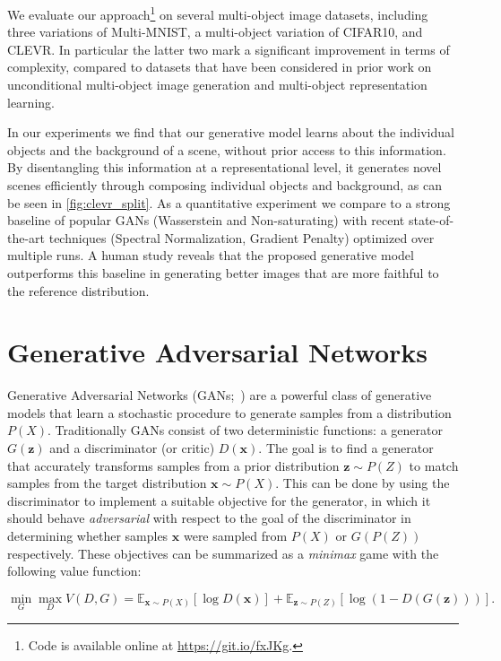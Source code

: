 \documentclass{article}
\begin{document}
We evaluate our approach\footnote{Code is available online at \url{https://git.io/fxJKg}.} on several multi-object image datasets, including three variations of Multi-MNIST, a multi-object variation of CIFAR10, and CLEVR.
In particular the latter two mark a significant improvement in terms of complexity, compared to datasets that have been considered in prior work on unconditional multi-object image generation and multi-object representation learning.

In our experiments we find that our generative model learns about the individual objects and the background of a scene, without prior access to this information.
By disentangling this information at a representational level, it generates novel scenes efficiently through composing individual objects and background, as can be seen in \autoref{fig:clevr_split}.
As a quantitative experiment we compare to a strong baseline of popular GANs (Wasserstein and Non-saturating) with recent state-of-the-art techniques (Spectral Normalization, Gradient Penalty) optimized over multiple runs.
A human study reveals that the proposed generative model outperforms this baseline in generating better images that are more faithful to the reference distribution.

\section{Generative Adversarial Networks}
Generative Adversarial Networks (GANs;~\cite{goodfellow2014generative}) are a powerful class of generative models that learn a stochastic procedure to generate samples from a distribution $P(X)$.
Traditionally GANs consist of two deterministic functions: a generator $G(\bm{z})$ and a discriminator (or critic) $D(\bm{x})$.
The goal is to find a generator that accurately transforms samples from a prior distribution $\bm{z}\sim P(Z)$ to match samples from the target distribution $\bm{x}\sim P(X)$.
This can be done by using the discriminator to implement a suitable objective for the generator, in which it should behave \emph{adversarial} with respect to the goal of the discriminator in determining whether samples $\bm{x}$ were sampled from $P(X)$ or $G(P(Z))$ respectively.
These objectives can be summarized as a \emph{minimax} game with the following value function:

\begin{equation}
\min_G \max_D V(D, G) = \mathbb{E}_{\bm{x} \sim P(X)} \left[\log D(\bm{x})\right] + \mathbb{E}_{\bm{z}\sim P(Z)} \left[\log(1 - D(G(\bm{z}))) \right].
\label{eq:gan}
\end{equation}
\end{document}
